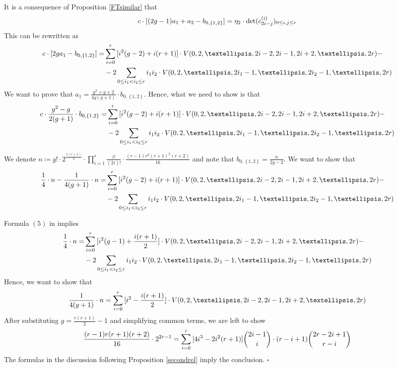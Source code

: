 \documentclass{article}
\theoremstyle{plain}
\theoremstyle{definition}
\begin{document}
It is a consequence of Proposition \ref{FTsimilar} that 
\[ c\cdot\text{\large[}(2g-1)a_1+a_2-b_{0,\left\{1,2\right\}}\text{\large]} = \eta_2\cdot\mathrm{det}(c^{(i)}_{2i-j})_{0\leq i,j\leq r} \]
This can be rewritten as 
\begin{align*}
	c\cdot \text{\large[}2ga_1 - b_{0,\left\{1,2\right\}} \text{\large]} =& \sum_{i=0}^r\text{\large[}i^2(g-2) +i(r+1)\text{\large]}\cdot  V(0,2,\ldots, 2i-2, 2i-1, 2i+2,\ldots, 2r)- \\
	& - 2\sum_{0\leq i_1<i_2\leq r}i_1i_2\cdot V(0,2,\ldots, 2i_1-1, \ldots, 2i_2-1,\ldots, 2r)
\end{align*}
We want to prove that $a_1 = \frac{g^2+g+2}{4g(g+1)}\cdot b_{0,\left\{1,2\right\}}$. Hence, what we need to show is that 
\begin{align*}
	c\cdot \frac{g^2-g}{2(g+1)}\cdot b_{0,\left\{1,2\right\}} =& \sum_{i=0}^r\text{\large[}i^2(g-2) +i(r+1)\text{\large]}\cdot  V(0,2,\ldots, 2i-2, 2i-1, 2i+2,\ldots, 2r)- \\
	& - 2\sum_{0\leq i_1<i_2\leq r}i_1i_2\cdot V(0,2,\ldots, 2i_1-1, \ldots, 2i_2-1,\ldots, 2r)
\end{align*}

We denote $n \coloneqq g!\cdot 2^{\frac{r(r+1)}{2}}\cdot\prod_{i=1}^r\frac{i!}{(2i)!}\cdot \frac{(r-1)r^2(r+1)^2(r+2)}{16}$ and note that $b_{0,\left\{1,2\right\}} = \frac{n}{2g-2}$. We want to show that 
\begin{align*}
	\frac{1}{4}\cdot n - \frac{1}{4(g+1)}\cdot n =& \sum_{i=0}^r\text{\large[}i^2(g-2) +i(r+1)\text{\large]}\cdot  V(0,2,\ldots, 2i-2, 2i-1, 2i+2,\ldots, 2r)- \\
	& - 2\sum_{0\leq i_1<i_2\leq r}i_1i_2\cdot V(0,2,\ldots, 2i_1-1, \ldots, 2i_2-1,\ldots, 2r)
\end{align*}

Formula $(5)$ in \cite{FarkasCastel} implies 
\begin{align*}
	\frac{1}{4}\cdot n  =& \sum_{i=0}^r\text{\large[}i^2(g-1) +\frac{i(r+1)}{2}\text{\large]}\cdot  V(0,2,\ldots, 2i-2, 2i-1, 2i+2,\ldots, 2r)- \\
	& - 2\sum_{0\leq i_1<i_2\leq r}i_1i_2\cdot V(0,2,\ldots, 2i_1-1, \ldots, 2i_2-1,\ldots, 2r)
\end{align*}
Hence, we want to show that 
\[ \frac{1}{4(g+1)}\cdot n = \sum_{i=0}^r \text{\Large[}i^2-\frac{i(r+1)}{2}\text{\Large]}\cdot  V(0,2,\ldots, 2i-2, 2i-1, 2i+2,\ldots, 2r) \]
After substituting $g = \frac{r(r+1)}{2}-1$ and simplifying common terms, we are left to show 
\[ \frac{(r-1)r(r+1)(r+2)}{16}\cdot 2^{2r-1} = \sum_{i=0}^r\text{\Large[}4i^3-2i^2(r+1)\text{\Large]}\binom{2i-1}{i}\cdot (r-i+1)\binom{2r-2i+1}{r-i} \]
The formulas in the discussion following Proposition \ref{secondrel} imply the conclusion. \hfill$\square$
\end{document}
